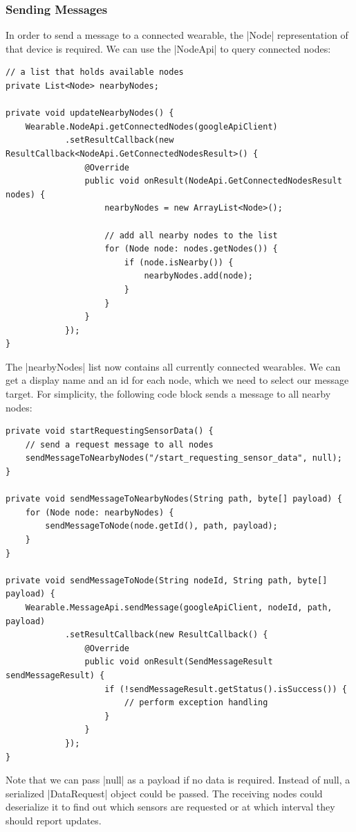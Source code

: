 \subsubsection{Sending Messages}
\label{sec:implementation:transferringdata:send}

In order to send a message to a connected wearable, the |Node|\cite{androiddocs:node} representation of that device is required.
We can use the |NodeApi|\cite{androiddocs:nodeapi} to query connected nodes:

\begin{lstlisting}[label=nodes]
// a list that holds available nodes
private List<Node> nearbyNodes;

private void updateNearbyNodes() {
	Wearable.NodeApi.getConnectedNodes(googleApiClient)
			.setResultCallback(new ResultCallback<NodeApi.GetConnectedNodesResult>() {
				@Override
				public void onResult(NodeApi.GetConnectedNodesResult nodes) {
					nearbyNodes = new ArrayList<Node>();

					// add all nearby nodes to the list
					for (Node node: nodes.getNodes()) {
						if (node.isNearby()) {
							nearbyNodes.add(node);
						}
					}
				}
			});
}
\end{lstlisting}

The |nearbyNodes| list now contains all currently connected wearables.
We can get a display name and an id for each node, which we need to select our message target.
For simplicity, the following code block sends a message to all nearby nodes:

\begin{lstlisting}[label=sendmessage]
private void startRequestingSensorData() {
	// send a request message to all nodes
	sendMessageToNearbyNodes("/start_requesting_sensor_data", null);
}

private void sendMessageToNearbyNodes(String path, byte[] payload) {
	for (Node node: nearbyNodes) {
		sendMessageToNode(node.getId(), path, payload);
	}
}

private void sendMessageToNode(String nodeId, String path, byte[] payload) {
	Wearable.MessageApi.sendMessage(googleApiClient, nodeId, path, payload)
			.setResultCallback(new ResultCallback() {
				@Override
				public void onResult(SendMessageResult sendMessageResult) {
					if (!sendMessageResult.getStatus().isSuccess()) {
						// perform exception handling
					}
				}
			});
}
\end{lstlisting}

Note that we can pass |null| as a payload if no data is required.
Instead of null, a serialized |DataRequest| object could be passed.
The receiving nodes could deserialize it to find out which sensors are requested or at which interval they should report updates.

